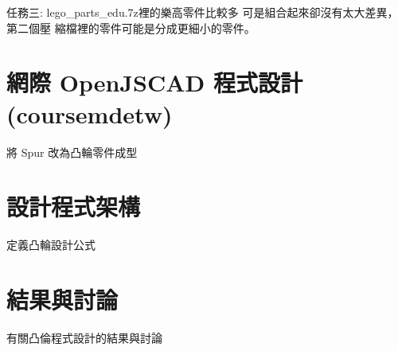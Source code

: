\documentclass[]{article}
\begin{document}
任務三: lego\_parts\_edu.7z裡的樂高零件比較多
可是組合起來卻沒有太大差異，第二個壓
縮檔裡的零件可能是分成更細小的零件。

\section{網際 OpenJSCAD
程式設計(coursemdetw)}\label{ux7db2ux969b-openjscad-ux7a0bux5f0fux8a2dux8a08coursemdetw}

將 Spur 改為凸輪零件成型

\section{設計程式架構}\label{ux8a2dux8a08ux7a0bux5f0fux67b6ux69cb}

定義凸輪設計公式

\section{結果與討論}\label{ux7d50ux679cux8207ux8a0eux8ad6-4}

有關凸倫程式設計的結果與討論
\end{document}
